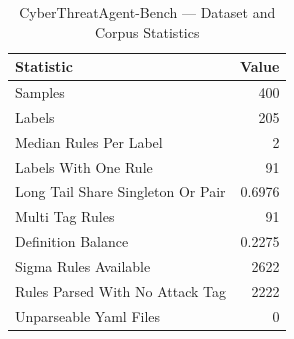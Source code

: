 \begin{table}[t]
\centering
\caption{CyberThreatAgent-Bench --- Dataset and Corpus Statistics}
\label{tab:dataset}
\begin{tabular}{lr}
\toprule
Statistic & Value \\ \midrule
Samples & 400 \\
Labels & 205 \\
Median Rules Per Label & 2 \\
Labels With One Rule & 91 \\
Long Tail Share Singleton Or Pair & 0.6976 \\
Multi Tag Rules & 91 \\
Definition Balance & 0.2275 \\
Sigma Rules Available & 2622 \\
Rules Parsed With No Attack Tag & 2222 \\
Unparseable Yaml Files & 0 \\
\bottomrule
\end{tabular}
\end{table}